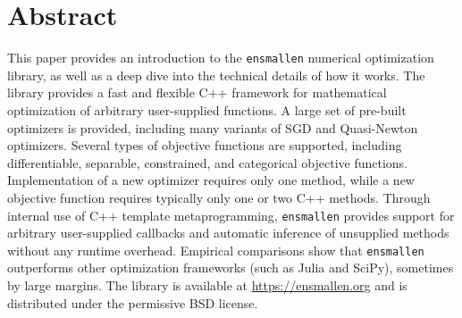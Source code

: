\section*{Abstract}

This paper provides an introduction to the {\tt ensmallen} numerical optimization library,
as well as a deep dive into the technical details of how it works.
The library provides a fast and flexible C++ framework
for mathematical optimization of arbitrary user-supplied functions.
A large set of pre-built optimizers is provided,
including many variants of SGD and Quasi-Newton optimizers.
Several types of objective functions are supported, including differentiable,
separable, constrained, and categorical objective functions.
Implementation of a new optimizer requires only one method,
while a new objective function requires typically only one or two C++ methods.
Through internal use of C++ template metaprogramming, {\tt ensmallen} provides support for arbitrary
user-supplied callbacks and automatic inference of unsupplied methods without
any runtime overhead.
Empirical comparisons show that {\tt ensmallen}
outperforms other optimization frameworks (such as Julia and SciPy), sometimes
by large margins.  The library is available at \url{https://ensmallen.org}
and is distributed under the permissive BSD license.



